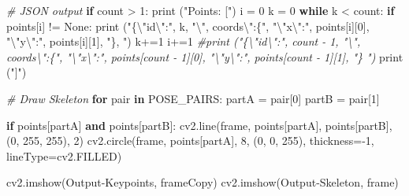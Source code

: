 \documentclass[
  12pt,
  a4paper,
]{article}
\newenvironment{Shaded}{}{}
\newcommand{\BuiltInTok}[1]{#1}
\newcommand{\CharTok}[1]{\textcolor[rgb]{0.25,0.44,0.63}{#1}}
\newcommand{\CommentTok}[1]{\textcolor[rgb]{0.38,0.63,0.69}{\textit{#1}}}
\newcommand{\ControlFlowTok}[1]{\textcolor[rgb]{0.00,0.44,0.13}{\textbf{#1}}}
\newcommand{\DecValTok}[1]{\textcolor[rgb]{0.25,0.63,0.44}{#1}}
\newcommand{\KeywordTok}[1]{\textcolor[rgb]{0.00,0.44,0.13}{\textbf{#1}}}
\newcommand{\NormalTok}[1]{#1}
\newcommand{\OperatorTok}[1]{\textcolor[rgb]{0.40,0.40,0.40}{#1}}
\newcommand{\StringTok}[1]{\textcolor[rgb]{0.25,0.44,0.63}{#1}}
\newcommand{\VariableTok}[1]{\textcolor[rgb]{0.10,0.09,0.49}{#1}}
\begin{document}
\begin{Shaded}
\begin{Highlighting}[numbers=left,,]
\CommentTok{\# JSON output}
\ControlFlowTok{if}\NormalTok{ count }\OperatorTok{\textgreater{}} \DecValTok{1}\NormalTok{:}
    \BuiltInTok{print}\NormalTok{ (}\StringTok{"Points: ["}\NormalTok{)}
\NormalTok{    i }\OperatorTok{=} \DecValTok{0}
\NormalTok{    k }\OperatorTok{=} \DecValTok{0}
    \ControlFlowTok{while}\NormalTok{ k }\OperatorTok{\textless{}}\NormalTok{ count:}
        \ControlFlowTok{if}\NormalTok{ points[i] }\OperatorTok{!=} \VariableTok{None}\NormalTok{:}
            \BuiltInTok{print}\NormalTok{ (}\StringTok{"\{}\CharTok{\textbackslash{}"}\StringTok{id}\CharTok{\textbackslash{}"}\StringTok{:"}\NormalTok{, k, }\StringTok{"}\CharTok{\textbackslash{}"}\StringTok{, coords}\CharTok{\textbackslash{}"}\StringTok{:\{"}\NormalTok{, }\StringTok{"}\CharTok{\textbackslash{}"}\StringTok{x}\CharTok{\textbackslash{}"}\StringTok{:"}\NormalTok{, points[i][}\DecValTok{0}\NormalTok{], }\StringTok{"}\CharTok{\textbackslash{}"}\StringTok{y}\CharTok{\textbackslash{}"}\StringTok{:"}\NormalTok{, points[i][}\DecValTok{1}\NormalTok{], }\StringTok{"\}, "}\NormalTok{)}
\NormalTok{            k}\OperatorTok{+=}\DecValTok{1}
\NormalTok{        i}\OperatorTok{+=}\DecValTok{1}    
    \CommentTok{\#print ("\{\textbackslash{}"id\textbackslash{}":", count {-} 1, "\textbackslash{}", coords\textbackslash{}":\{", "\textbackslash{}"x\textbackslash{}":", points[count {-} 1][0], "\textbackslash{}"y\textbackslash{}":", points[count {-} 1][1], "\} ")}
    \BuiltInTok{print}\NormalTok{ (}\StringTok{"]"}\NormalTok{)}

\CommentTok{\# Draw Skeleton}
\ControlFlowTok{for}\NormalTok{ pair }\KeywordTok{in}\NormalTok{ POSE\_PAIRS:}
\NormalTok{    partA }\OperatorTok{=}\NormalTok{ pair[}\DecValTok{0}\NormalTok{]}
\NormalTok{    partB }\OperatorTok{=}\NormalTok{ pair[}\DecValTok{1}\NormalTok{]}

    \ControlFlowTok{if}\NormalTok{ points[partA] }\KeywordTok{and}\NormalTok{ points[partB]:}
\NormalTok{        cv2.line(frame, points[partA], points[partB], (}\DecValTok{0}\NormalTok{, }\DecValTok{255}\NormalTok{, }\DecValTok{255}\NormalTok{), }\DecValTok{2}\NormalTok{)}
\NormalTok{        cv2.circle(frame, points[partA], }\DecValTok{8}\NormalTok{, (}\DecValTok{0}\NormalTok{, }\DecValTok{0}\NormalTok{, }\DecValTok{255}\NormalTok{), thickness}\OperatorTok{={-}}\DecValTok{1}\NormalTok{, lineType}\OperatorTok{=}\NormalTok{cv2.FILLED)}


\NormalTok{cv2.imshow(}\StringTok{\textquotesingle{}Output{-}Keypoints\textquotesingle{}}\NormalTok{, frameCopy)}
\NormalTok{cv2.imshow(}\StringTok{\textquotesingle{}Output{-}Skeleton\textquotesingle{}}\NormalTok{, frame)}



\end{Highlighting}
\end{Shaded}
\end{document}
